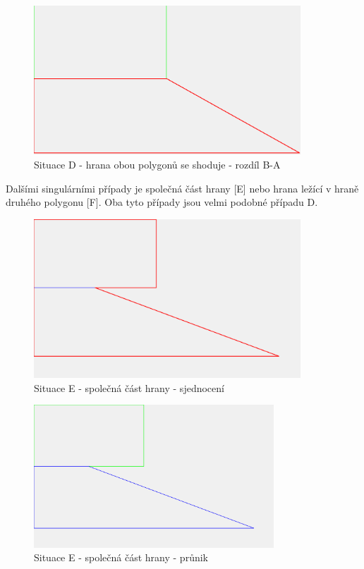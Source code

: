 \documentclass[a4paper,11pt,twoside]{article}
\begin{document}
\vspace{0.2cm}
\begin{figure}[hbt!] 
\begin{center}
\includegraphics[width=10cm]{pictures/D_diffBA.png} 
\caption[Situace D - hrana obou polygonů se shoduje - rozdíl B-A]{Situace D - hrana obou polygonů se shoduje - rozdíl B-A}
\label{fig:D_diffBA}
\end{center}
\end{figure}

Dalšími singulárními případy je společná část hrany [E] nebo hrana ležící v hraně druhého polygonu [F]. Oba tyto případy jsou velmi podobné případu D.

\vspace{0.2cm}
\begin{figure}[hbt!] 
\begin{center}
\includegraphics[width=10cm]{pictures/E_union_v2.png} 
\caption[Situace E - společná část hrany - sjednocení]{Situace E - společná část hrany - sjednocení}
\label{fig:E_union}
\end{center}
\end{figure}

\vspace{0.2cm}
\begin{figure}[hbt!] 
\begin{center}
\includegraphics[width=9cm]{pictures/E_intersect_v2.png} 
\caption[Situace E - společná část hrany - průnik]{Situace E - společná část hrany - průnik}
\label{fig:E_intersect}
\end{center}
\end{figure}
\end{document}
